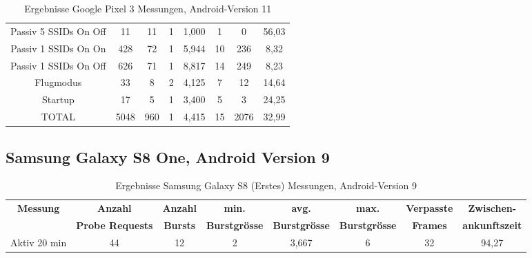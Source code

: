 \begin{landscape}
\begin{table}[h!]
\begin{tabular}{|c|c|c|c|c|c|c|c|}
      Passiv 5 SSIDs On Off & \phantom{00}11 & \phantom{0}11 & 1 & 1,000 & \phantom{0}1 & \phantom{000}0 & \phantom{0}56,03 \\
      Passiv 1 SSIDs On On & \phantom{0}428 & \phantom{0}72 & 1 & 5,944 & 10 & \phantom{0}236 & \phantom{00}8,32 \\
      Passiv 1 SSIDs On Off & \phantom{0}626 &\phantom{0} 71 & 1 & 8,817 & 14 & \phantom{0}249 & \phantom{00}8,23 \\
      Flugmodus & \phantom{00}33 & \phantom{00}8 & 2 & 4,125 & \phantom{0}7 & \phantom{00}12 & \phantom{0}14,64 \\
      Startup & \phantom{00}17 & \phantom{00}5 & 1 & 3,400 & \phantom{0}5 & \phantom{000}3 & \phantom{0}24,25 \\
      \hline
      TOTAL & 5048 & 960 & 1 & 4,415 & 15 & 2076 & \phantom{0}32,99 \\
      \hline
      \end{tabular}
      \caption{Ergebnisse Google Pixel 3 Messungen, Android-Version 11
      \label{table:googlepixel3-11-results}} 
   \end{table}

   \clearpage
   
   \subsection*{Samsung Galaxy S8 One, Android Version 9}
   \begin{table}[h!]
      \centering
      \begin{tabular}{|c|c|c|c|c|c|c|c|}
      \hline
      \textbf{Messung} & \textbf{Anzahl} & \textbf{Anzahl} & \textbf{min.} & \textbf{avg.} & \textbf{max.} & \textbf{Verpasste} & \textbf{Zwischen-}\\
      & \textbf{Probe Requests} & \textbf{Bursts} & \textbf{Burstgrösse} & \textbf{Burstgrösse} & \textbf{Burstgrösse} & \textbf{Frames} & \textbf{ankunftszeit}\\
      \hline
      Aktiv 20 min & 44 & 12 & 2 & 3,667 & 6 & 32 & 94,27 \\
      \hline
      \end{tabular}
      \caption{Ergebnisse Samsung Galaxy S8 (Erstes) Messungen, Android-Version 9
      \label{table:samsunggalaxys8-1-9-results}} 
   \end{table}


\end{landscape}
